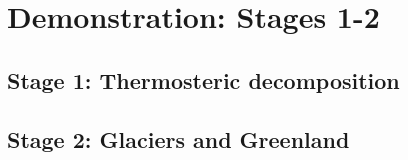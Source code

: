 \documentclass[11pt]{article}
\begin{document}
\section{Demonstration: Stages 1-2}
\label{sec:demo}

\subsection{Stage 1: Thermosteric decomposition}
%
%
%
%
%

\subsection{Stage 2: Glaciers and Greenland}
%
%
%
%
%
%
\end{document}
